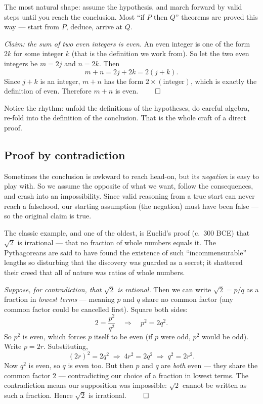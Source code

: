The most natural shape: assume the hypothesis, and march forward by valid steps
until you reach the conclusion. Most ``if $P$ then $Q$'' theorems are proved this
way --- start from $P$, deduce, arrive at $Q$.

\begin{example}
\label{ch40:ex-direct}
\emph{Claim: the sum of two even integers is even.} An even integer is one of the
form $2k$ for some integer $k$ (that is the definition we work from). So let the
two even integers be $m = 2j$ and $n = 2k$. Then
\[
  m + n = 2j + 2k = 2(j+k).
\]
Since $j+k$ is an integer, $m+n$ has the form $2 \times (\text{integer})$, which is
exactly the definition of even. Therefore $m+n$ is even. $\qed$

Notice the rhythm: unfold the definitions of the hypotheses, do careful algebra,
re-fold into the definition of the conclusion. That is the whole craft of a direct
proof.
\end{example}

\subsection{Proof by contradiction}

Sometimes the conclusion is awkward to reach head-on, but its \emph{negation} is
easy to play with. So we assume the opposite of what we want, follow the
consequences, and crash into an impossibility. Since valid reasoning from a true
start can never reach a falsehood, our starting assumption (the negation) must
have been false --- so the original claim is true.

\begin{historybox}
The classic example, and one of the oldest, is
Euclid's proof (c.\ 300 BCE) that $\sqrt 2$ is irrational --- that no fraction of
whole numbers equals it. The Pythagoreans are said to have found the existence of
such ``incommensurable'' lengths so disturbing that the discovery was guarded as a
secret; it shattered their creed that all of nature was ratios of whole numbers.
\end{historybox}

\begin{example}
\label{ch40:ex-sqrt2}
\emph{Suppose, for contradiction, that $\sqrt 2$ is rational.} Then we can write
$\sqrt 2 = p/q$ as a fraction in \emph{lowest terms} --- meaning $p$ and $q$ share
no common factor (any common factor could be cancelled first). Square both sides:
\[
  2 = \frac{p^2}{q^2} \quad\Longrightarrow\quad p^2 = 2q^2.
\]
So $p^2$ is even, which forces $p$ itself to be even (if $p$ were odd, $p^2$ would
be odd). Write $p = 2r$. Substituting,
\[
  (2r)^2 = 2q^2 \;\Longrightarrow\; 4r^2 = 2q^2 \;\Longrightarrow\; q^2 = 2r^2.
\]
Now $q^2$ is even, so $q$ is even too. But then $p$ and $q$ are \emph{both} even
--- they share the common factor $2$ --- contradicting our choice of a fraction in
lowest terms. The contradiction means our supposition was impossible: $\sqrt 2$
cannot be written as such a fraction. Hence $\sqrt 2$ is irrational. $\qed$
\end{example}

